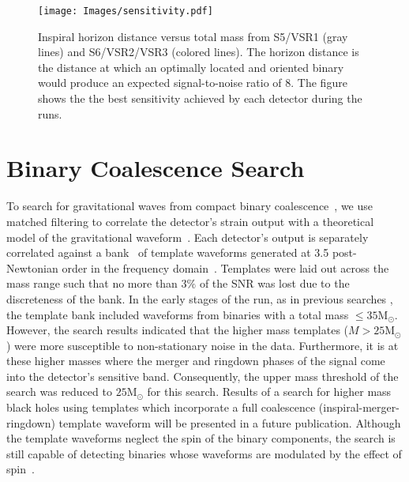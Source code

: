 \documentclass[prd,superscriptaddress,showpacs,amssymb,amsmath,amsfonts,aps,altaffilletter,nofootinbib,letterpaper,twocolumn]{revtex4}
\def\Msun{\ensuremath{\mathrm{M_{\odot}}}}
\def\12to18{Abbott:2009qj}
\def\sfive1yr{Collaboration:2009tt}
\def\sfivelvc{S5LowMassLV}
\begin{document}
\begin{figure}[ht]
\texttt{[image: Images/sensitivity.pdf]}
\caption{
Inspiral horizon distance versus total mass from S5/VSR1 (gray lines)
and S6/VSR2/VSR3 (colored lines). The horizon distance is the distance
at which an optimally located and oriented binary would produce an
expected signal-to-noise ratio of 8.  The figure shows the the best
sensitivity achieved by each detector during the runs.} 
\label{fig:sensitivity}
\end{figure}


\section{Binary Coalescence Search}
\label{sec:search}

To search for gravitational waves from compact binary
coalescence~\cite{Collaboration:2009tt,Abbott:2009qj, S5LowMassLV}, we
use matched filtering to correlate the detector's strain output with a
theoretical model of the gravitational waveform~\cite{Allen:2005fk}.
Each detector's output is separately correlated against a
bank~\cite{BBCCS:2006} of template waveforms generated at 3.5
post-Newtonian order in the frequency domain~\cite{Blanchet:1995ez,
Blanchet:2004ek}.  Templates were laid out across the mass range such
that no more than $3\%$ of the \ac{SNR} was lost due to the discreteness
of the bank.  In the early stages of the run, as in previous searches
\cite{\sfive1yr,\12to18,\sfivelvc}, the template bank included waveforms
from binaries with a total mass $\leq 35\Msun$.  However, the search
results indicated that the higher mass templates ($M > 25 \Msun$) were
more susceptible to non-stationary noise in the data.  Furthermore, it
is at these higher masses where the merger and ringdown phases of the
signal come into the detector's sensitive band.  Consequently, the upper
mass threshold of the search was reduced to $25 \Msun$ for this search.
Results of a search for higher mass black holes using templates which
incorporate a full coalescence (inspiral-merger-ringdown) template
waveform will be presented in a future publication.  Although the
template waveforms neglect the spin of the binary components, the search
is still capable of detecting binaries whose waveforms are modulated by
the effect of spin~\cite{VanDenBroeck:2009gd}. 
\end{document}
